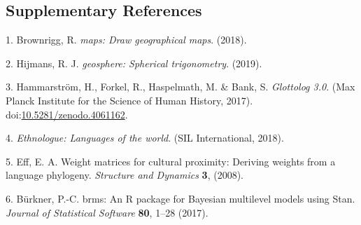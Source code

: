 \documentclass[
  english,
  man,floatsintext]{apa6}
\begin{document}
\begin{appendix}
\newpage

\hypertarget{supplementary-references}{%
\subsection*{Supplementary References}\label{supplementary-references}}

\hypertarget{refs}{}
\leavevmode\hypertarget{ref-Brownrigg2018}{}%
1. Brownrigg, R. \emph{maps: Draw geographical maps}. (2018).

\leavevmode\hypertarget{ref-Hijmans2019}{}%
2. Hijmans, R. J. \emph{geosphere: Spherical trigonometry}. (2019).

\leavevmode\hypertarget{ref-Glottolog}{}%
3. Hammarström, H., Forkel, R., Haspelmath, M. \& Bank, S.
\emph{Glottolog 3.0}. (Max Planck Institute for the Science of Human
History, 2017).
doi:\href{https://doi.org/10.5281/zenodo.4061162}{10.5281/zenodo.4061162}.

\leavevmode\hypertarget{ref-Ethnologue}{}%
4. \emph{Ethnologue: Languages of the world}. (SIL International, 2018).

\leavevmode\hypertarget{ref-Eff2008}{}%
5. Eff, E. A. Weight matrices for cultural proximity: Deriving weights
from a language phylogeny. \emph{Structure and Dynamics} \textbf{3},
(2008).

\leavevmode\hypertarget{ref-Burkner2017}{}%
6. Bürkner, P.-C. brms: An R package for Bayesian multilevel models
using Stan. \emph{Journal of Statistical Software} \textbf{80}, 1--28
(2017).
\end{appendix}
\end{document}
